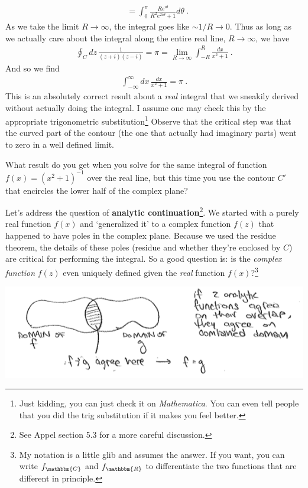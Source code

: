 \begin{example}
\begin{align}
  &= 
  \int_0^\pi
  \frac{Re^{i\theta}}{R^2 e^{2i\theta}+1} d\theta \ .
\end{align}
As we take the limit $R\to\infty$, the integral goes like $\sim 1/R \to 0$. Thus as long as we actually care about the integral along the entire real line, $R\to \infty$, we have
\begin{align}
  \oint_Cdz\, \frac{1}{(z+i)(z-i)}  
  = \pi 
  = \lim_{R\to\infty} \int_{-R}^R \frac{dx}{x^2+1} \ .
\end{align}
And so we find
\begin{align}
  \int_{-\infty}^\infty dx \, 
  \frac{dx}{x^2+1}
  = \pi \ .
\end{align}
This is an absolutely correct result about a \emph{real} integral that we sneakily derived without actually doing the integral. I assume one may check this by the appropriate trigonometric substitution\footnote{Just kidding, you can just check it on \emph{Mathematica}. You can even tell people that you did the trig substitution if it makes you feel better.} Observe that the critical step was that the curved part of the contour (the one that actually had imaginary parts) went to zero in a well defined limit. 
\end{example}
\begin{exercise}
What result do you get when you solve for the same integral of function $f(x)=(x^2+1)^{-1}$ over the real line, but this time you use the contour $C'$ that encircles the lower half of the complex plane?
\end{exercise}
Let's address the question of \textbf{analytic continuation}\footnote{See Appel section 5.3 for a more careful discussion.}. We started with a purely real function $f(x)$ and `generalized it' to a complex function $f(z)$ that happened to have poles in the complex plane. Because we used the residue theorem, the details of these poles (residue and whether they're enclosed by $C$) are critical for performing the integral. So a good question is: is the \emph{complex function} $f(z)$ even uniquely defined given the \emph{real} function $f(x)$?\footnote{My notation is a little glib and assumes the answer. If you want, you can write $f_\mathbbm{C}$ and $f_\mathbbm{R}$ to differentiate the two functions that are different in principle.}
\begin{center}
\includegraphics[width=.9\textwidth]{figures/Lec_2017_14_analytic_continuation.png}
\end{center}
